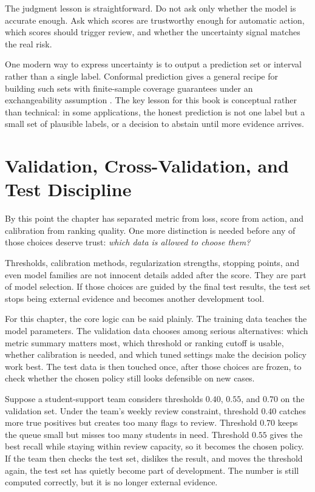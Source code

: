 The judgment lesson is straightforward. Do not ask only whether the model is accurate enough. Ask which scores are trustworthy enough for automatic action, which scores should trigger review, and whether the uncertainty signal matches the real risk.

\begin{advancednote}
One modern way to express uncertainty is to output a prediction set or interval rather than a single label. Conformal prediction gives a general recipe for building such sets with finite-sample coverage guarantees under an exchangeability assumption \citep{shafer2008}. The key lesson for this book is conceptual rather than technical: in some applications, the honest prediction is not one label but a small set of plausible labels, or a decision to abstain until more evidence arrives.
\end{advancednote}

\section{Validation, Cross-Validation, and Test Discipline}

By this point the chapter has separated metric from loss, score from action, and calibration from ranking quality. One more distinction is needed before any of those choices deserve trust: \emph{which data is allowed to choose them?}

Thresholds, calibration methods, regularization strengths, stopping points, and even model families are not innocent details added after the score. They are part of model selection. If those choices are guided by the final test results, the test set stops being external evidence and becomes another development tool.

For this chapter, the core logic can be said plainly. The training data teaches the model parameters. The validation data chooses among serious alternatives: which metric summary matters most, which threshold or ranking cutoff is usable, whether calibration is needed, and which tuned settings make the decision policy work best. The test data is then touched once, after those choices are frozen, to check whether the chosen policy still looks defensible on new cases.

\begin{example}
Suppose a student-support team considers thresholds $0.40$, $0.55$, and $0.70$ on the validation set. Under the team's weekly review constraint, threshold $0.40$ catches more true positives but creates too many flags to review. Threshold $0.70$ keeps the queue small but misses too many students in need. Threshold $0.55$ gives the best recall while staying within review capacity, so it becomes the chosen policy. If the team then checks the test set, dislikes the result, and moves the threshold again, the test set has quietly become part of development. The number is still computed correctly, but it is no longer external evidence.
\end{example}

